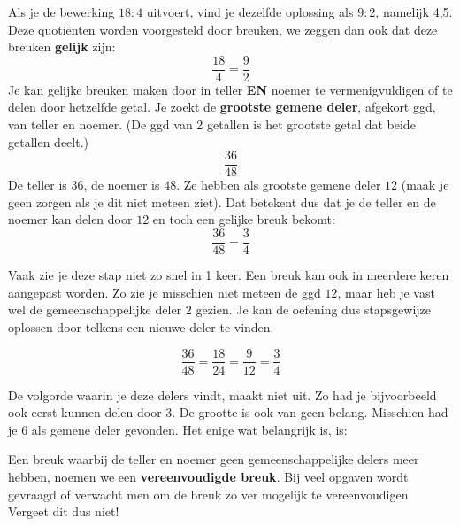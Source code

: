 Als je de bewerking $18:4$ uitvoert, vind je dezelfde oplossing als $9:2$, namelijk 4,5. Deze quoti\"enten worden voorgesteld door breuken, we zeggen dan ook dat deze breuken \textbf{gelijk} zijn:
\begin{equation*}
\frac{18}{4}=\frac{9}{2}
\end{equation*}
Je kan gelijke breuken maken door in teller \textbf{EN} noemer te vermenigvuldigen of te delen door hetzelfde getal. Je zoekt de \textbf{grootste gemene deler}, afgekort ggd, van teller en noemer. (De ggd van 2 getallen is het grootste getal dat beide getallen deelt.)
\begin{equation*}
\frac{36}{48}
\end{equation*}
De teller is $36$, de noemer is $48$. Ze hebben als grootste gemene deler $12$ (maak je geen zorgen als je dit niet meteen ziet). Dat betekent dus dat je de teller en de noemer kan delen door $12$ en toch een gelijke breuk bekomt:
\begin{equation*}
\frac{36}{48}=\frac{3}{4}
\end{equation*}


Vaak zie je deze stap niet zo snel in 1 keer. Een breuk kan ook in meerdere keren aangepast worden. Zo zie je misschien niet meteen de ggd $12$, maar heb je vast wel de gemeenschappelijke deler $2$ gezien. Je kan de oefening dus stapsgewijze oplossen door telkens een nieuwe deler te vinden.

\begin{equation*}
\frac{36}{48}=\frac{18}{24}=\frac{9}{12}=\frac{3}{4}
\end{equation*}

De volgorde waarin je deze delers vindt, maakt niet uit. Zo had je bijvoorbeeld ook eerst kunnen delen door $3$. De grootte is ook van geen belang. Misschien had je $6$ als gemene deler gevonden. Het enige wat belangrijk is, is:



Een breuk waarbij de teller en noemer geen gemeenschappelijke delers meer hebben, noemen we een \textbf{vereenvoudigde breuk}. Bij veel opgaven wordt gevraagd of verwacht men om de breuk zo ver mogelijk te vereenvoudigen. Vergeet dit dus niet!

